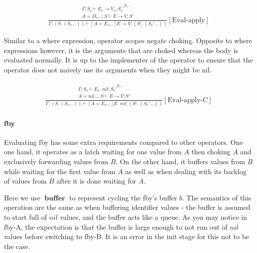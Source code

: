 \documentclass{scrartcl}
\DeclareMathOperator{\ceval}{\overset{C}{\rightarrow}}
\DeclareMathOperator{\buffer}{\mathbf{buffer}}
\begin{document}
    \begin{align*}
    \frac{
        \begin{matrix}
        \overline{\Gamma; S_v \vdash E_v \rightarrow V_v; S_v'}^{E_v...} \\
        A = D_v...; S \vdash E \rightarrow V; S'
        \end{matrix}
    }{
        \Gamma; (S, (S_v...)) \vdash [A=E_v...]E \rightarrow V; (S', (S_v'...))
    }[\text{Eval-apply}]
    \end{align*}
    
    Similar to a where expression, operator scopes negate choking. Opposite to where expressions however, it is the arguments that are choked whereas the body is evaluated normally. It is up to the implementer of the operator to ensure that the operator does not naively use its arguments when they might be nil.
    
    \begin{align*}
    \frac{
        \begin{matrix}
        \overline{\Gamma; S_v \vdash E_v \ceval nil; S_v'}^{E_v...} \\
        A = nil...; S \vdash E \rightarrow V; S'
        \end{matrix}
    }{
        \Gamma; (S, (S_v...)) \vdash [A=E_v...]E \ceval nil; (S', (S_v'...))
    }[\text{Eval-apply-C}]
    \end{align*}
    
    \paragraph{fby}
    
    Evaluating fby has some extra requirements compared to other operators. One one hand, it operates as a latch waiting for one value from $A$ then choking $A$ and exclusively forwarding values from $B$. On the other hand, it buffers values from $B$ while waiting for the first value from $A$ as well as when dealing with its backlog of values from $B$ after it is done waiting for $A$.
    
    Here we use $\buffer$ to represent cycling the fby's buffer $b$. The semantics of this operation are the same as when buffering identifier values - the buffer is assumed to start full of $nil$ values, and the buffer acts like a queue. As you may notice in fby-A, the expectation is that the buffer is large enough to not run out of $nil$ values before switching to fby-B. It is an error in the init stage for this not to be the case.
    
\end{document}
